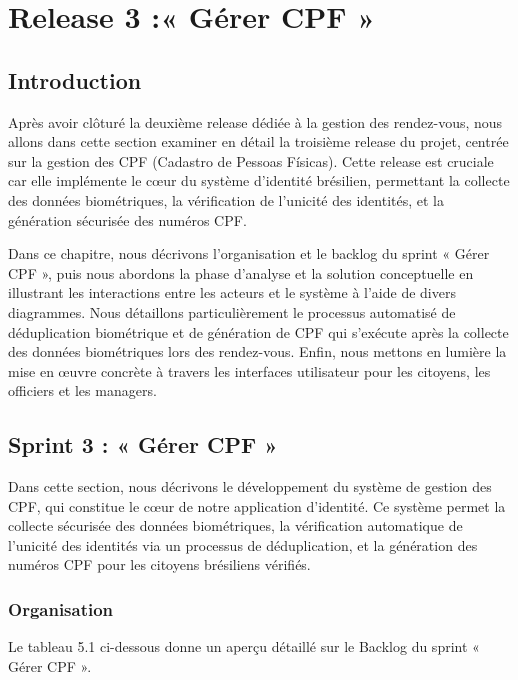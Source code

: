 \chapter{Release 3 :« Gérer CPF » }
\label{chap_sprint3}
\section*{Introduction}
\label{sec_introduction:ch4}
Après avoir clôturé la deuxième release dédiée à la gestion des rendez-vous, nous allons dans cette section examiner en détail la troisième release du projet, centrée sur la gestion des CPF (Cadastro de Pessoas Físicas). Cette release est cruciale car elle implémente le cœur du système d'identité brésilien, permettant la collecte des données biométriques, la vérification de l'unicité des identités, et la génération sécurisée des numéros CPF.

Dans ce chapitre, nous décrivons l'organisation et le backlog du sprint « Gérer CPF », puis nous abordons la phase d'analyse et la solution conceptuelle en illustrant les interactions entre les acteurs et le système à l'aide de divers diagrammes. Nous détaillons particulièrement le processus automatisé de déduplication biométrique et de génération de CPF qui s'exécute après la collecte des données biométriques lors des rendez-vous. Enfin, nous mettons en lumière la mise en œuvre concrète à travers les interfaces utilisateur pour les citoyens, les officiers et les managers.

\section{Sprint 3 : « Gérer CPF »}
Dans cette section, nous décrivons le développement du système de gestion des CPF, qui constitue le cœur de notre application d'identité. Ce système permet la collecte sécurisée des données biométriques, la vérification automatique de l'unicité des identités via un processus de déduplication, et la génération des numéros CPF pour les citoyens brésiliens vérifiés.
\subsection{Organisation}
Le tableau 5.1 ci-dessous donne un aperçu détaillé sur le Backlog du sprint « Gérer CPF ».

